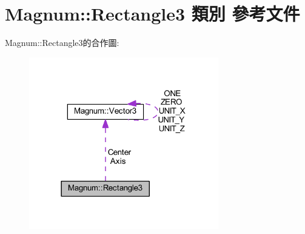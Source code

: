 \hypertarget{class_magnum_1_1_rectangle3}{}\section{Magnum\+:\+:Rectangle3 類別 參考文件}
\label{class_magnum_1_1_rectangle3}


Magnum\+:\+:Rectangle3的合作圖\+:\nopagebreak
\begin{figure}[H]
\begin{center}
\leavevmode
\includegraphics[width=234pt]{class_magnum_1_1_rectangle3__coll__graph}
\end{center}
\end{figure}
